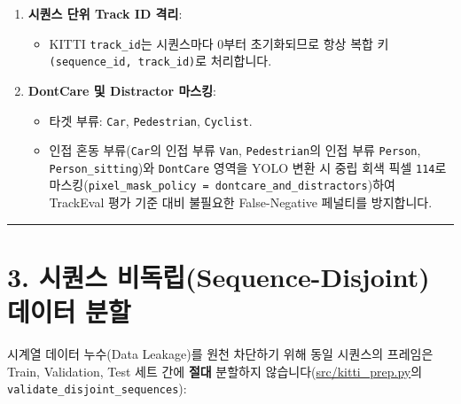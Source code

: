 \documentclass[10.5pt,a4paper]{article}
\begin{document}
\begin{enumerate}[leftmargin=1.8em,itemsep=2pt]
\begin{itemize}[leftmargin=1.5em,itemsep=2pt]
\item 행당 17개 필드, 유한 실수값, \texttt{x2 > x1}, \texttt{y2 > y1} 조건을 강제합니다.
\end{itemize}
\item \textbf{시퀀스 단위 Track ID 격리}:
\begin{itemize}[leftmargin=1.5em,itemsep=2pt]
\item KITTI \texttt{track\_\allowbreak{}id}는 시퀀스마다 0부터 초기화되므로 항상 복합 키 \texttt{(sequence\_\allowbreak{}id,\allowbreak{} track\_\allowbreak{}id)}로 처리합니다.
\end{itemize}
\item \textbf{DontCare 및 Distractor 마스킹}:
\begin{itemize}[leftmargin=1.5em,itemsep=2pt]
\item 타겟 부류: \texttt{Car}, \texttt{Pedestrian}, \texttt{Cyclist}.
\item 인접 혼동 부류(\texttt{Car}의 인접 부류 \texttt{Van}, \texttt{Pedestrian}의 인접 부류 \texttt{Person}, \texttt{Person\_\allowbreak{}sitting})와 \texttt{DontCare} 영역을 YOLO 변환 시 중립 회색 픽셀 \texttt{114}로 마스킹(\texttt{pixel\_\allowbreak{}mask\_\allowbreak{}policy = dontcare\_\allowbreak{}and\_\allowbreak{}distractors})하여 TrackEval 평가 기준 대비 불필요한 False-Negative 페널티를 방지합니다.
\end{itemize}
\end{enumerate}

\par\noindent\rule{\textwidth}{0.4pt}\par\medskip

\section{3. 시퀀스 비독립(Sequence-Disjoint) 데이터 분할}

시계열 데이터 누수(Data Leakage)를 원천 차단하기 위해 동일 시퀀스의 프레임은 Train, Validation, Test 세트 간에 \textbf{절대} 분할하지 않습니다(\href{https://github.com/Heisnotanimposter/Totalcare\_autonomous\_driving\_Yolov5/blob/main/src/kitti\_prep.py}{src/kitti\_prep.py}의 \texttt{validate\_\allowbreak{}disjoint\_\allowbreak{}sequences}):
\end{document}
